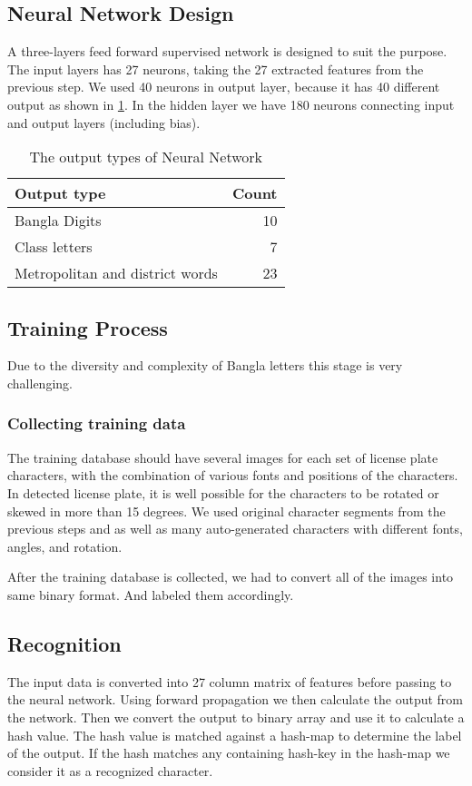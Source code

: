 \documentclass{standalone}
\begin{document}
\subsection{Neural Network Design}
A three-layers feed forward supervised network is designed to suit the purpose. The input layers has 27 neurons, taking the 27 extracted features from the previous step. We used 40 neurons in output layer, because it has 40 different output as shown in \ref{table:OutputTypes}. In the hidden layer we have 180 neurons connecting input and output layers (including bias).

\begin{table}
\centering
\caption{The output types of Neural Network}
\label{table:OutputTypes}
\begin{tabular}{|l|r|}
\hline
Output type & Count  \\
\hline
Bangla Digits   & 10 \\
Class letters   & 7  \\
Metropolitan and district words  & 23 \\
\hline
\end{tabular}
\end{table}


\subsection{Training Process}
Due to the diversity and complexity of Bangla letters this stage is very challenging.

\subsubsection{Collecting training data}
The training database should have several images for each set of license plate characters, with the combination of various fonts and positions of the characters. In detected license plate, it is well possible for the characters to be rotated or skewed in more than 15 degrees. We used original character segments from the previous steps and as well as many auto-generated characters with different fonts, angles, and rotation. 

After the training database is collected, we had to convert all of the images into same binary format. And labeled them accordingly. 

\subsection{Recognition}
The input data is converted into 27 column matrix of features before passing to the neural network. Using forward propagation we then calculate the output from the network. Then we convert the output to binary array and use it to calculate a hash value. The hash value is matched against a hash-map to determine the label of the output. If the hash matches any containing hash-key in the hash-map we consider it as a recognized character. 
\end{document}
